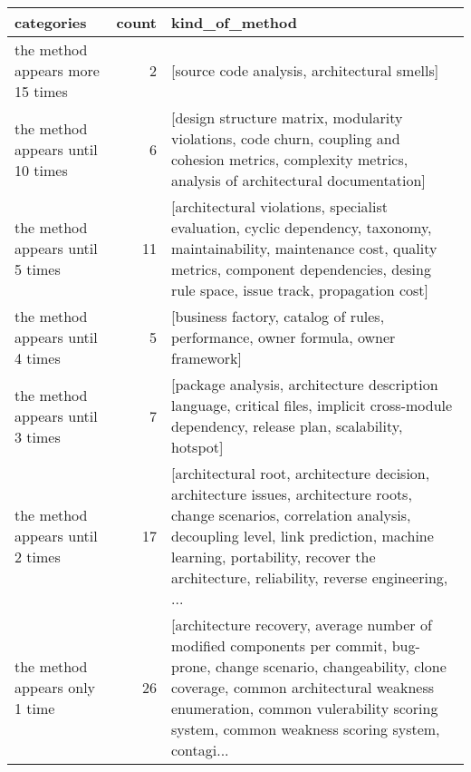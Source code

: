 \begin{tabular}{lrl}
\toprule
                        categories &  count &                                                                                                                                                                                                                                                  kind\_of\_method \\
\midrule
  the method appears more 15 times &      2 &                                                                                                                                                                                                                    [source code analysis, architectural smells] \\
 the method appears until 10 times &      6 &                                                                                                        [design structure matrix, modularity violations, code churn, coupling and cohesion metrics, complexity metrics, analysis of architectural documentation] \\
  the method appears until 5 times &     11 &                                                    [architectural violations, specialist evaluation, cyclic dependency, taxonomy, maintainability, maintenance cost, quality metrics, component dependencies, desing rule space, issue track, propagation cost] \\
  the method appears until 4 times &      5 &                                                                                                                                                                               [business factory, catalog of rules, performance, owner formula, owner framework] \\
  the method appears until 3 times &      7 &                                                                                                                     [package analysis, architecture description language, critical files, implicit cross-module dependency, release plan, scalability, hotspot] \\
  the method appears until 2 times &     17 &  [architectural root, architecture decision, architecture issues, architecture roots, change scenarios, correlation analysis, decoupling level, link prediction, machine learning, portability, recover the architecture, reliability, reverse engineering, ... \\
    the method appears only 1 time &     26 &  [architecture recovery, average number of modified components per commit, bug-prone, change scenario, changeability, clone coverage, common architectural weakness enumeration, common vulerability scoring system, common weakness scoring system, contagi... \\
\bottomrule
\end{tabular}

